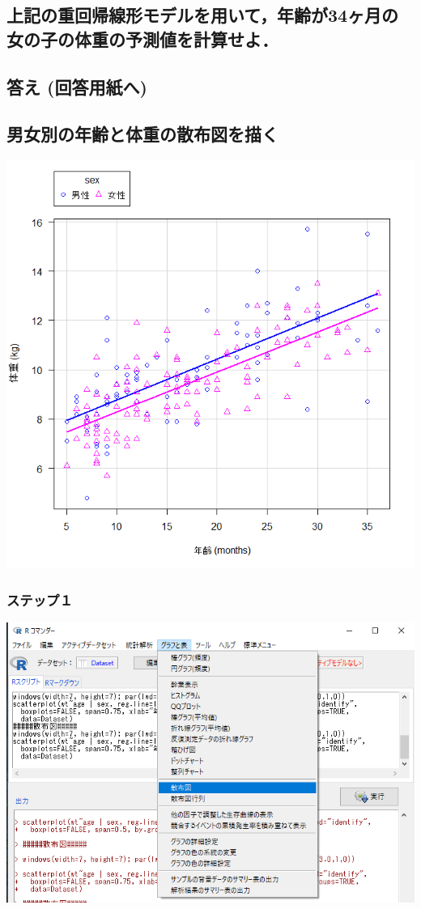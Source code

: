 \documentclass[11pt,]{problemset}
\begin{document}
\hypertarget{34}{%
\subsection{上記の重回帰線形モデルを用いて，年齢が34ヶ月の女の子の体重の予測値を計算せよ．}\label{34}}

\hypertarget{--5}{%
\subsection{答え (回答用紙へ)}\label{--5}}

\subsection{男女別の年齢と体重の散布図を描く}

\begin{center}\includegraphics[width=0.5\linewidth]{pic/scatter02} \end{center}

\hypertarget{-12}{%
\subsubsection{ステップ１}\label{-12}}

\begin{center}\includegraphics[width=0.5\linewidth,height=0.5\textheight]{pic/scatter03} \end{center}
\end{document}
